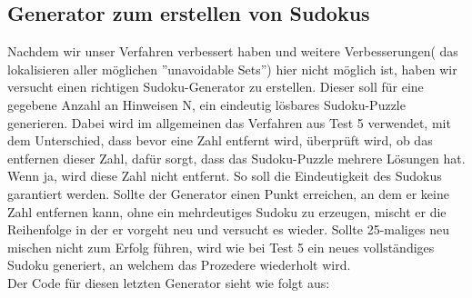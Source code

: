 \documentclass[11pt,a4paper]{article}
\begin{document}
\subsection{Generator zum erstellen von Sudokus}
Nachdem wir unser Verfahren verbessert haben und weitere Verbesserungen( das lokalisieren aller möglichen ''unavoidable Sets'') hier nicht möglich ist, haben wir versucht einen richtigen Sudoku-Generator zu erstellen. Dieser soll für eine gegebene Anzahl an Hinweisen N, ein eindeutig lösbares Sudoku-Puzzle generieren. Dabei wird im allgemeinen das Verfahren aus Test 5 verwendet, mit dem Unterschied, dass bevor eine Zahl entfernt wird, überprüft wird, ob das entfernen dieser Zahl, dafür sorgt, dass das Sudoku-Puzzle mehrere Lösungen hat. Wenn ja, wird diese Zahl nicht entfernt. So soll die Eindeutigkeit des Sudokus garantiert werden. Sollte der Generator einen Punkt erreichen, an dem er keine Zahl entfernen kann, ohne ein mehrdeutiges Sudoku zu erzeugen, mischt er die Reihenfolge in der er vorgeht neu und versucht es wieder. Sollte 25-maliges neu mischen nicht zum Erfolg führen, wird wie bei Test 5 ein neues vollständiges Sudoku generiert, an welchem das Prozedere wiederholt wird.\\
Der Code für diesen letzten Generator sieht wie folgt aus:
\ \\
\end{document}
